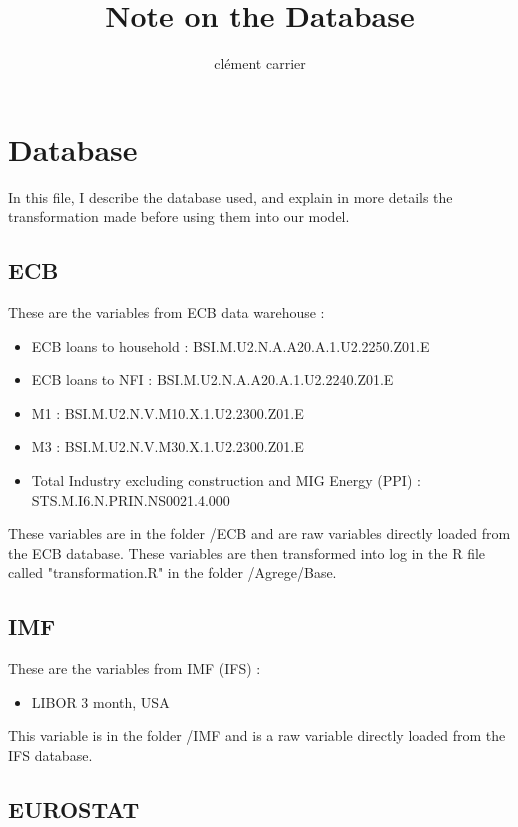 \documentclass[11pt,a4paper]{article}
\title{Note on the Database}
\author{clément carrier}
\begin{document}
\maketitle

\section{Database}

In this file, I describe the database used, and explain in more details the transformation made before using them into our model. 

\subsection{ECB}

These are the variables from ECB data warehouse :
\begin{itemize}
\item ECB loans to household : BSI.M.U2.N.A.A20.A.1.U2.2250.Z01.E
\item ECB loans to NFI : BSI.M.U2.N.A.A20.A.1.U2.2240.Z01.E
\item M1 : BSI.M.U2.N.V.M10.X.1.U2.2300.Z01.E
\item M3 : BSI.M.U2.N.V.M30.X.1.U2.2300.Z01.E
\item Total Industry excluding construction and MIG Energy (PPI) : STS.M.I6.N.PRIN.NS0021.4.000
\end{itemize}

\vspace{0.5cm}

These variables are in the folder /ECB and are raw variables directly loaded from the ECB database. These variables are then transformed into log in the R file called "transformation.R" in the folder /Agrege/Base. 

\subsection{IMF}

These are the variables from IMF (IFS) :
\begin{itemize}
\item LIBOR 3 month, USA
\end{itemize}

\vspace{0.5cm}

This variable is in the folder /IMF and is a raw variable directly loaded from the IFS database.

\subsection{EUROSTAT}
\end{document}
